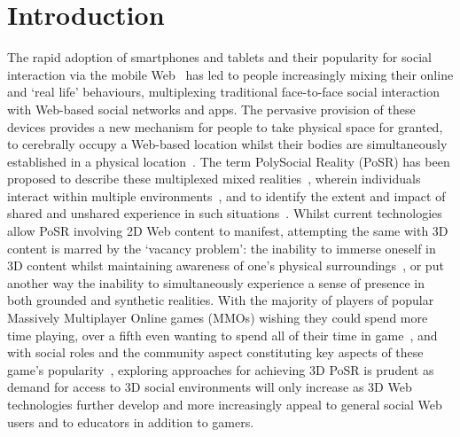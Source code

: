 \section{Introduction}
The rapid adoption of smartphones and tablets and their popularity for social interaction via the mobile Web~\cite{Accenture2012} has led to people increasingly mixing their online and `real life' behaviours, multiplexing traditional face-to-face social interaction with Web-based social networks and apps. The pervasive provision of these devices provides a new mechanism for people to take physical space for granted, to cerebrally occupy a Web-based location whilst their bodies are simultaneously established in a physical location~\cite{Applin2011}. The term PolySocial Reality (PoSR) has been proposed to describe these multiplexed mixed realities~\cite{Applin2011a}, wherein individuals interact within multiple environments~\cite{Applin2012}, and to identify the extent and impact of shared and unshared experience in such situations~\cite{Applin2012a}. Whilst current technologies allow PoSR involving 2D Web content to manifest, attempting the same with 3D content is marred by the `vacancy problem': the inability to immerse oneself in 3D content whilst maintaining awareness of one's physical surroundings~\cite{Lifton2007a}, or put another way the inability to simultaneously experience a sense of presence in both grounded and synthetic realities. With the majority of players of popular Massively Multiplayer Online games (MMOs) wishing they could spend more time playing, over a fifth even wanting to spend all of their time in game~\cite{Castronova2006}, and with social roles and the community aspect constituting key aspects of these game's popularity~\cite{Castronova2006, Bartle2004}, exploring approaches for achieving 3D PoSR is prudent as demand for access to 3D social environments will only increase as 3D Web technologies further develop and more increasingly appeal to general social Web users and to educators in addition to gamers.

